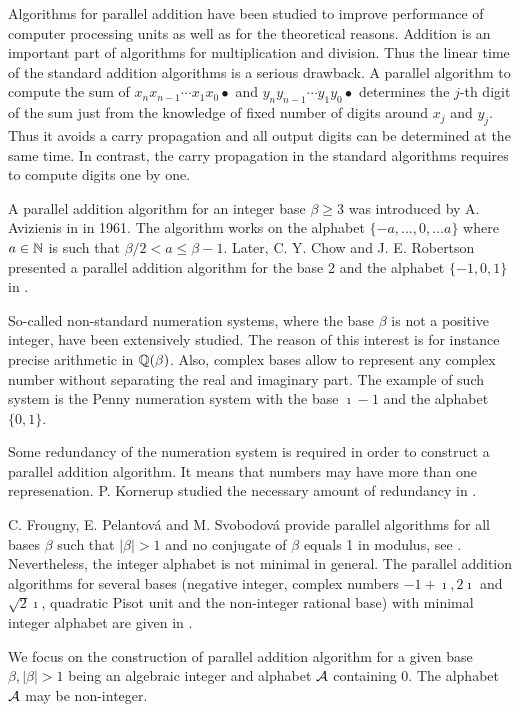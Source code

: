 Algorithms for parallel addition have been studied to improve performance of computer processing units as well as for the theoretical reasons. Addition is an important part of algorithms for multiplication and division. Thus the linear time of the standard addition algorithms is a serious drawback. A parallel algorithm to compute the sum of $x_n x_{n-1}\cdots x_1 x_0 \bullet$ and $y_n y_{n-1}\cdots y_1 y_0 \bullet$ determines the $j$-th digit of the sum just from the knowledge of fixed number of digits around $x_j$ and $y_j$. Thus it avoids a carry propagation and all output digits can be determined at the same time. In contrast, the carry propagation in the standard algorithms requires to compute digits one by one.

A parallel addition algorithm for an integer base $\beta\geq3$ was introduced by A. Avizienis in \cite{avizienis} in 1961. The algorithm works on the alphabet $\{-a, \dots, 0, \dots a\}$ where $a\in\mathbb{N}$ is such that $\beta/2 <a \leq \beta-1$. Later, C. Y. Chow and J. E. Robertson presented a parallel addition algorithm for the base 2 and the alphabet $\{-1,0,1\}$ in \cite{chow}.   

So-called non-standard numeration systems, where the base $\beta$ is not a positive integer, have been extensively studied. The reason of this interest is for instance precise arithmetic in $\mathbb{Q}(\beta)$. Also, complex bases allow to represent any complex number without separating the real and imaginary part. The example of such system is the Penny numeration system with the base $\imath -1$ and the alphabet $\{0,1\}$.

Some redundancy of the numeration system is required in order to construct a parallel addition algorithm. It means that numbers may have more than one represenation. P. Kornerup studied the necessary amount of redundancy in \cite{kornerup}. 

C. Frougny, E. Pelantov\'a and M. Svobodov\'a provide parallel algorithms for all bases $\beta$ such that $|\beta|>1$ and no conjugate of $\beta$ equals 1 in modulus, see \cite{parAddNS}. Nevertheless, the integer alphabet is not minimal in general.
 The parallel addition algorithms for several bases (negative integer, complex numbers $-1+\imath, 2\imath$ and $\sqrt{2}\imath$, quadratic Pisot unit and the non-integer rational base) with minimal integer alphabet are given in \cite{minAlph}.
 

We focus on the construction of parallel addition algorithm for a given base $\beta, |\beta|>1$ being an algebraic integer and alphabet $\mathcal{A}$ containing 0. The alphabet $\mathcal{A}$ may be non-integer. 


